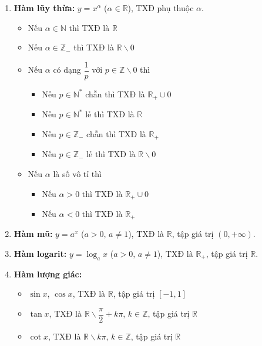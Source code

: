 \documentclass[12pt,a4paper]{article}
\begin{document}
\begin{congthuc}[title={Bảng hàm số sơ cấp cơ bản}]
  \begin{enumerate}
    \item \textbf{Hàm lũy thừa:} $y = x^\alpha$ ($\alpha \in \mathbb{R}$), TXĐ phụ thuộc $\alpha$.
    \begin{itemize}
        \item Nếu $\alpha \in \mathbb{N}$ thì TXĐ là $\mathbb{R}$
        \item Nếu $\alpha \in \mathbb{Z}_-$ thì TXĐ là $\mathbb{R} \backslash{0}$
        \item Nếu $\alpha$ có dạng $\dfrac{1}{p}$ với $p \in \mathbb{Z} \backslash{0}$ thì
        \begin{itemize}
            \item Nếu $p \in \mathbb{N}^*$ chẵn thì TXĐ là $\mathbb{R}_+ \cup 0$
            \item Nếu $p \in \mathbb{N}^*$ lẻ thì TXĐ là $\mathbb{R}$
            \item Nếu $p \in \mathbb{Z}_-$ chẵn thì TXĐ là $\mathbb{R}_+$
            \item Nếu $p \in \mathbb{Z}_-$ lẻ thì TXĐ là $\mathbb{R} \backslash{0}$
        \end{itemize}
        \item Nếu $\alpha$ là số vô tỉ thì
        \begin{itemize}
            \item Nếu $\alpha > 0$ thì TXĐ là $\mathbb{R}_+ \cup 0$
            \item Nếu $\alpha < 0$ thì TXĐ là $\mathbb{R}_+$
        \end{itemize}
    \end{itemize}
    \item \textbf{Hàm mũ:} $y = a^x$ ($a > 0,\, a \ne 1$), TXĐ là $\mathbb{R}$, tập giá trị $(0, +\infty)$.
    \item \textbf{Hàm logarit:} $y = \log_a x$ ($a > 0,\, a \ne 1$), TXĐ là $\mathbb{R_+}$, tập giá trị $\mathbb{R}$.
    \item \textbf{Hàm lượng giác:}
    \begin{itemize}
        \item $\sin x$, $\cos x$, TXĐ là $\mathbb{R}$, tập giá trị $[-1,1]$
        \item $\tan x$, TXĐ là $\mathbb{R} \backslash{\dfrac{\pi}{2} + k\pi}$, $k \in \mathbb{Z}$, tập giá trị $\mathbb{R}$
        \item $\cot x$, TXĐ là $\mathbb{R} \backslash{k\pi}$, $k \in \mathbb{Z}$, tập giá trị $\mathbb{R}$

\end{itemize}
\end{enumerate}
\end{congthuc}
\end{document}
